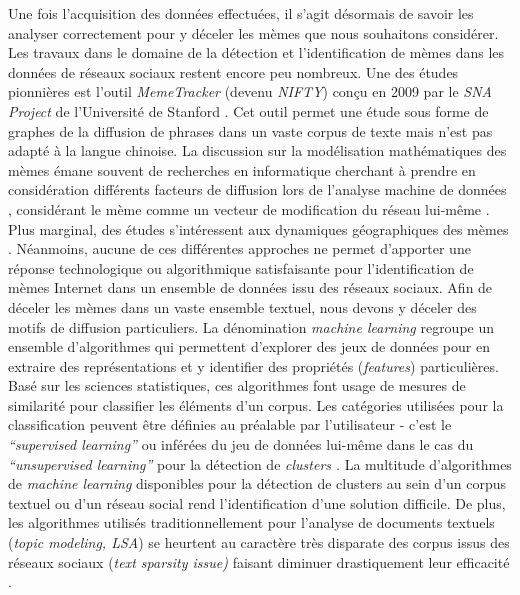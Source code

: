 Une fois l{\textquoteright}acquisition des données effectuées, il s{\textquoteright}agit désormais de savoir les analyser correctement pour y déceler les mèmes que nous souhaitons considérer. Les travaux dans le domaine de la détection et l{\textquoteright}identification de mèmes dans les données de réseaux sociaux restent encore peu nombreux. Une des études pionnières est l{\textquoteright}outil \textit{MemeTracker }(devenu \textit{NIFTY}) con\c{c}u en 2009 par le \textit{SNA Project }de l{\textquoteright}Université de Stanford \citep{Leskovec2009}. Cet outil permet une étude sous forme de graphes de la diffusion de phrases dans un vaste corpus de texte mais n{\textquoteright}est pas adapté à la langue chinoise. La discussion sur la modélisation mathématiques des mèmes \citep{Ahmad2006, Nye2011} émane souvent de recherches en informatique cherchant à prendre en considération différents facteurs de diffusion lors de l{\textquoteright}analyse machine de données \citep{Zubiaga2011, Wang2011}, considérant le mème comme un vecteur de modification du réseau lui-m\^eme \citep{Ienco2010}. Plus marginal, des études s{\textquoteright}intéressent aux dynamiques géographiques des mèmes \citep{Kamath2013}. Néanmoins, aucune de ces différentes approches ne permet d{\textquoteright}apporter une réponse technologique ou algorithmique satisfaisante pour l{\textquoteright}identification de mèmes Internet dans un ensemble de données issu des réseaux sociaux. Afin de déceler les mèmes dans un vaste ensemble textuel, nous devons y déceler des motifs de diffusion particuliers. La dénomination \textit{machine learning }regroupe un ensemble d{\textquoteright}algorithmes qui permettent d{\textquoteright}explorer des jeux de données pour en extraire des représentations et y identifier des propriétés (\textit{features}) particulières. Basé sur les sciences statistiques, ces algorithmes font usage de mesures de similarité pour classifier les éléments d{\textquoteright}un corpus. Les catégories utilisées pour la classification peuvent \^etre définies au préalable par l{\textquoteright}utilisateur - c{\textquoteright}est le \textit{{\textquotedblleft}supervised learning{\textquotedblright} }ou inférées du jeu de données lui-m\^eme dans le cas du \textit{{\textquotedblleft}unsupervised learning{\textquotedblright}} pour la détection de \textit{clusters }\citep{Breiman2001}\textit{. }La multitude d{\textquoteright}algorithmes de \textit{machine learning }disponibles pour la détection de clusters au sein d{\textquoteright}un corpus textuel ou d{\textquoteright}un réseau social \citep{Nettleton2013, Robins2013} rend l{\textquoteright}identification d{\textquoteright}une solution difficile. De plus, les algorithmes utilisés traditionnellement pour l{\textquoteright}analyse de documents textuels (\textit{topic modeling, LSA}) se heurtent au caractère très disparate des corpus issus des réseaux sociaux (\textit{text sparsity issue) }faisant diminuer drastiquement leur efficacité \citep{Hong2010}.


